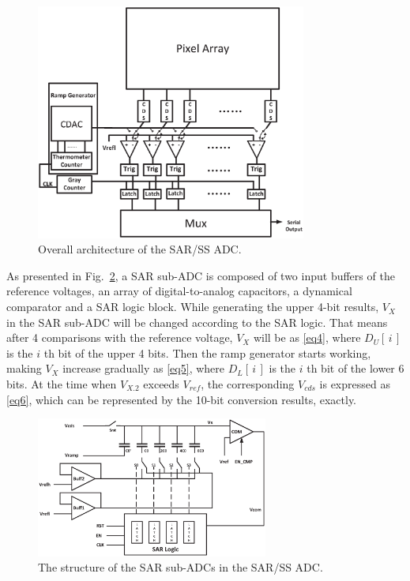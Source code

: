 \begin{figure}[htbp]
  \centerline{\includegraphics[width=3.5in]{./Figures/SARADC.eps}}
  \caption{Overall architecture of the SAR/SS ADC.}
  \label{SARADC}
  \end{figure} 

As presented in Fig.~\ref{SAR}, a SAR sub-ADC is composed of two input buffers of the reference voltages, an array of digital-to-analog capacitors, a dynamical comparator and a SAR logic block. While generating the upper 4-bit results, $V_{X}$ in the SAR sub-ADC will be changed according to the SAR logic. That means after 4 comparisons 
with the reference voltage, $V_{X}$ will be as \eqref{eq4}, where $D_{U}\left[\,i\,\right]$ is the $i$ th bit of the upper 4 bits. 
Then the ramp generator starts working, making $V_{X}$ increase gradually as \eqref{eq5}, where $D_{L}\left[\,i\,\right]$ is the $i$ th bit of the lower 6 bits. 
At the time when $V_{X.2}$ exceeds $V_{ref}$, the corresponding $V_{cds}$ is expressed as \eqref{eq6}, which can be represented by the 10-bit conversion results, exactly.

\begin{figure}[htbp]
	\centerline{\includegraphics[width=3in]{./Figures/SAR.eps}}
	\caption{The structure of the SAR sub-ADCs in the SAR/SS ADC.}
	\label{SAR}
\end{figure}

